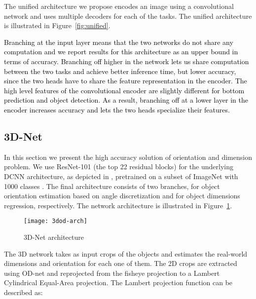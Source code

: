\documentclass[10pt,twocolumn,letterpaper]{article}
\begin{document}
The unified architecture we propose encodes an image using a convolutional network and uses multiple decoders for each of the tasks. The unified architecture is illustrated in Figure~\ref{fig:unified}.

\textcolor{black}{
Branching at the input layer means that the two networks do not share any computation and we report results for this architecture as an upper bound in terms of accuracy. Branching off higher in the network lets us share computation between the two tasks and achieve better inference time, but lower accuracy, since the two heads have to share the feature representation in the encoder. 
The high level features of the convolutional encoder are slightly different for bottom prediction and object detection. As a result, branching off at a lower layer in the encoder increases accuracy and lets the two heads specialize their features. }
\subsection{3D-Net} 

In this section we present the high accuracy solution of orientation and dimension problem. We use ResNet-101 \cite{DBLP:journals/corr/HeZRS15} (the top 22 residual blocks) for the underlying DCNN architecture, as depicted in \cite{Hara2017DesigningDC}, pretrained on a subset of ImageNet with 1000 classes \cite{ILSVRC15}. The final architecture consists of two branches, for object orientation estimation based on angle discretization and for object dimensions regression, respectively. The network architecture is illustrated in Figure~\ref{fig:3dod-arch}.

\begin{figure}[t]
\begin{center}
\texttt{[image: 3dod-arch]}
\end{center}
   \caption{3D-Net architecture}
\label{fig:3dod-arch}
\end{figure}
The 3D network takes as input crops of the objects and estimates the real-world dimensions and orientation for each one of them. The 2D crops are extracted using OD-net and reprojected from the fisheye projection to a Lambert Cylindrical Equal-Area projection\cite{lamb-eq}. The Lambert projection function can be described as:
\end{document}
